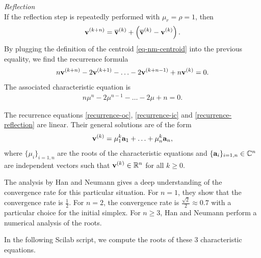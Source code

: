 \emph{Reflection}  \\
If the reflection step is repeatedly performed
with $\mu_r = \rho = 1$, then 
\begin{eqnarray}
\mathbf{v}^{(k+n)} = \overline{\bold{v}}^{(k)} 
+ \left( \overline{\bold{v}}^{(k)} - \mathbf{v}^{(k)}\right).
\end{eqnarray}
By plugging the definition of the centroid \ref{eq-nm-centroid} into the previous equality, we 
find the recurrence formula
\begin{eqnarray}
n \mathbf{v}^{(k+n)} - 2 \mathbf{v}^{(k+1)} - \ldots - 2 \mathbf{v}^{(k+n-1)} + n\mathbf{v}^{(k)} = 0.
\end{eqnarray}
The associated characteristic equation is 
\begin{eqnarray}
\label{recurrence-reflection}
n \mu^n - 2 \mu^{n-1} - \ldots - 2 \mu + n = 0.
\end{eqnarray}

The recurrence equations \ref{recurrence-oc}, \ref{recurrence-ic} and \ref{recurrence-reflection}
are linear. Their general solutions are of the form 
\begin{eqnarray}
\mathbf{v}^{(k)} = \mu_1^k \bold{a}_1 + \ldots + \mu_n^k \bold{a}_n,
\end{eqnarray}
where $\{\mu_i\}_{i=1,n}$ are the roots of the characteristic equations and 
$\{\bold{a}_i\}_{i=1,n} \in \mathbb{C}^n$ are independent vectors such that $\mathbf{v}^{(k)} \in \mathbb{R}^n$
for all $k\geq 0$.

The analysis by Han and Neumann \cite{HanNeumann2006} gives a 
deep understanding of the convergence rate for this particular 
situation. For $n=1$, they show that the convergence rate is $\frac{1}{2}$.
For $n=2$, the convergence rate is $\frac{\sqrt{2}}{2}\approx 0.7$ with
a particular choice for the initial simplex. For $n\geq 3$, Han and Neumann \cite{HanNeumann2006}
perform a numerical analysis of the roots.

In the following Scilab script, we compute the roots of these 3 characteristic 
equations. 

